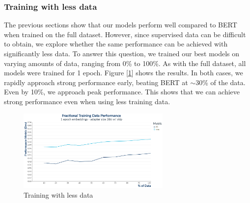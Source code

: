 \subsubsection{Training with less data}
The previous sections show that our models perform well compared to BERT when trained on the full dataset. However, since supervised data can be difficult to obtain, we explore whether the same performance can be achieved with significantly less data. To answer this question, we trained our best models on varying amounts of data, ranging from 0\% to 100\%. As with the full dataset, all models were trained for 1 epoch. Figure [\ref{fig:1_epoch_embeddings__adapter_386_with_skip}] shows the results. In both cases, we rapidly approach strong performance early, beating BERT at $\sim$30\% of the data. Even by 10\%, we approach peak performance. This shows that we can achieve strong performance even when using less training data. 

\begin{figure}[ht]
	\centering
	\includegraphics[width=7.5cm]{images/1_Epoch_Embeddings__Adapter_386_with_Skip.png}
	\caption{\label{fig:1_epoch_embeddings__adapter_386_with_skip}Training with less data}
\end{figure}

